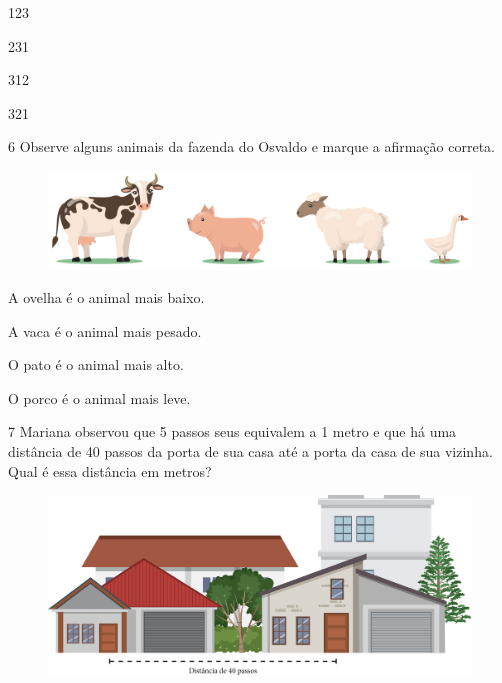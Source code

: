 \begin{escolha}[itemsep=-5pt]
\item 123

\item 231

\item 312

\item 321
\end{escolha}

\num{6} Observe alguns animais da fazenda do Osvaldo e marque a afirmação correta.

\begin{figure}[H]
\includegraphics[width=.8\textwidth]{./media/image116.png}
\end{figure}


\begin{escolha}[itemsep=-5pt]
\item A ovelha é o animal mais baixo.

\item A vaca é o animal mais pesado.

\item O pato é o animal mais alto.

\item O porco é o animal mais leve.
\end{escolha}

\num{7} Mariana observou que 5 passos seus equivalem a 1 metro e que há uma
distância de 40 passos da porta de sua casa até a porta da casa de sua vizinha. Qual é essa distância em metros?

\begin{figure}[H]
\centering
\includegraphics[width=.8\textwidth]{./media/image117.png}
\end{figure}

